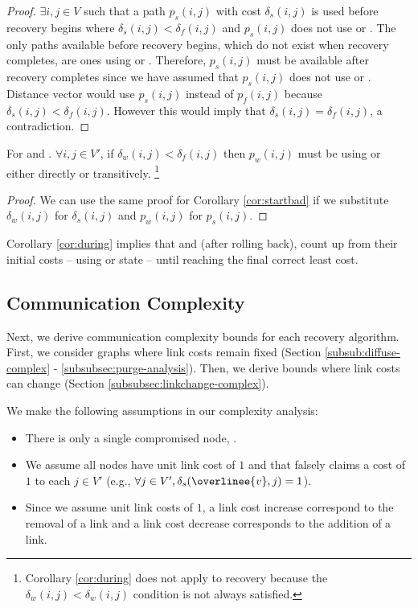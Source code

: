 {\begin{proof}
$\exists i,j\in V$ such that a path $p_{s}(i,j)$ with cost $\delta_{s}(i,j)$ is used before recovery begins where
$\delta_{s}(i,j) < \delta_f(i,j)$ and  $p_{s}(i,j)$ does not use \badvector or \oldvectors.  The only paths available before recovery begins, which do not 
exist when recovery completes, are ones using \badvector or \oldvectors. Therefore, $p_{s}(i,j)$ must be available after recovery completes since we have assumed that
$p_{s}(i,j)$ does not use \badvector or \oldvectors. Distance vector would use  $p_{s}(i,j)$ instead of $p_f(i,j)$ because 
$\delta_{s}(i,j) < \delta_f(i,j)$.  However this would imply that $\delta_{s}(i,j)= \delta_f(i,j)$, a contradiction.
\end{proof}

\begin{corollary}
For \second and \cprs. $\forall i,j \in V'$, if $\delta_w(i,j) < \delta_f(i,j)$ then $p_w(i,j)$  must be using \badvector or \oldvector either directly or transitively.
{\footnote {\small Corollary \ref{cor:during} does not apply to \purge recovery because the  $\delta_w(i,j) < \delta_w(i,j)$ condition is not always satisfied.}} 
\label{cor:during}
\end{corollary}

\begin{proof}
We can use the same proof for Corollary \ref{cor:startbad} if we substitute $\delta_w(i,j)$ for $\delta_s(i,j)$ and $p_w(i,j)$ for $p_s(i,j)$.
\end{proof}

Corollary \ref{cor:during} implies that \second and \cpr (after rolling back), count up from their initial costs -- using \badvector or \oldvector state -- until 
reaching the final correct least cost.



\subsection{Communication Complexity}
\label{subsec:complex}

Next, we derive communication complexity bounds for each recovery algorithm. First, we consider graphs where link costs remain fixed
(Section \ref{subsub:diffuse-complex} - \ref{subsubsec:purge-analysis}). Then, we derive bounds where link costs can change (Section \ref{subsubsec:linkchange-complex}).

We make the following assumptions in our complexity analysis:
\begin{itemize}
	\item There is only a single compromised node, \bads.
	\item We assume all nodes have unit link cost of $1$ and that \bad falsely claims a cost of $1$ to each $j \in V'$ (e.g., $\forall j \in V', \delta_s(\overlinee{v},j) = 1$).
	\item Since we assume unit link costs of $1$, a link cost increase correspond to the removal of a link and a link cost decrease corresponds to the addition of a link.
\end{itemize}

}

